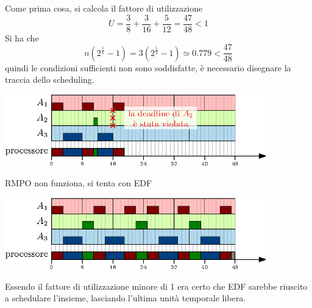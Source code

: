\documentclass[10pt, letterpaper]{report}
\begin{document}
Come prima cosa, si calcola il fattore di utilizzazione 
$$ U=\frac{3}{8}+\frac{3}{16}+\frac{5}{12}=\frac{47}{48}<1$$
Si ha che 
$$ n(2^{\frac{1}{n}}-1)=3(2^{\frac{1}{3}}-1)\simeq 0.779 < \frac{47}{48}$$
quindi le condizioni sufficienti non sono soddisfatte, 
è necessario disegnare la traccia dello scheduling.
\begin{center}
    \includegraphics[width=0.85\textwidth ]{images/esempioRMPO2.eps}
\end{center}
RMPO non funziona, si tenta con EDF
\begin{center}
    \includegraphics[width=0.85\textwidth ]{images/esempioEDF2.eps}
\end{center}
Essendo il fattore di utilizzazione minore di 1 era certo che EDF sarebbe 
riuscito a schedulare l'insieme, lasciando l'ultima unità temporale 
libera.
\end{document}
